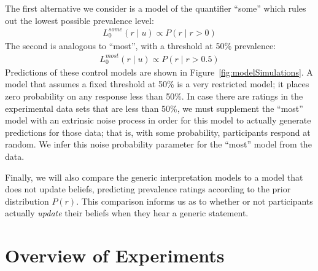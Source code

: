 \documentclass[floatsintext,doc]{apa6}
\begin{document}
The first alternative we consider is a model of the quantifier \enquote{some} which rules out the lowest possible prevalence level:
\begin{eqnarray}
L_0^{some}(r \mid u) \propto  P(r \mid r > 0)  \label{eq:someModel}
\end{eqnarray}
The second is analogous to \enquote{most}, with a threshold at 50\% prevalence:
\begin{eqnarray}
L_0^{most}(r \mid u) \propto  P(r \mid r > 0.5)  \label{eq:mostModel}
\end{eqnarray}
Predictions of these control models are shown in Figure~\ref{fig:modelSimulations}.
A model that assumes a fixed threshold at 50\% is a very restricted model; it places zero probability on any response less than 50\%.
In case there are ratings in the experimental data sets that are less than 50\%, we must supplement the \enquote{most} model with an extrinsic noise process in order for this model to actually generate predictions for those data; that is, with some probability, participants respond at random.
We infer this noise probability parameter for the \enquote{most} model from the data.

Finally, we will also compare the generic interpretation models to a model that does not update beliefs, predicting prevalence ratings according to the prior distribution \(P(r)\).
This comparison informs us as to whether or not participants actually \emph{update} their beliefs when they hear a generic statement.


\hypertarget{overview-of-experiments}{%
\section{Overview of Experiments}\label{overview-of-experiments}}
\end{document}
